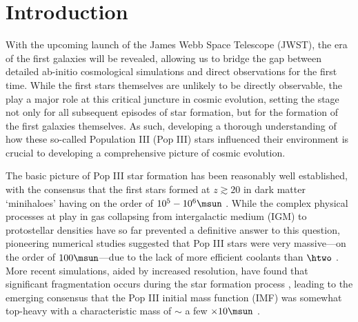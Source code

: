 \section{Introduction}
\label{intro}

With the upcoming launch of the James Webb Space Telescope (JWST), the era of the first galaxies will be revealed, allowing us to bridge the gap between detailed ab-initio cosmological simulations and direct observations for the first time. While the first stars themselves are unlikely to be directly observable, the play a major role at this critical juncture in cosmic evolution, setting the stage not only for all subsequent episodes of star formation, but for the formation of the first galaxies themselves.  As such, developing a thorough understanding of how these so-called Population III (Pop III) stars influenced their environment is crucial to developing a comprehensive picture of cosmic evolution.

The basic picture of Pop III star formation has been reasonably well established, with the consensus that the first stars formed at $z\gtrsim20$ in dark matter `minihaloes' having on the order of $10^5 - 10^6\msun$ \citep{CouchmanRees1986, HaimanThoulLoeb1996, Tegmarketal1997}. While the complex physical processes at play in gas collapsing from intergalactic medium (IGM) to protostellar densities have so far prevented a definitive answer to this question, pioneering numerical studies suggested that Pop III stars were very massive---on the order of $100\msun$---due to the lack of more efficient coolants than $\htwo$ \citep[e.g.,][]{BrommCoppiLarson1999, BrommCoppiLarson2002, AbelBryanNorman2002, Yoshidaetal2003, BrommLarson2004, Yoshidaetal2006, O'SheaNorman2007}. More recent simulations, aided by increased resolution, have found that significant fragmentation occurs during the star formation process \citep{StacyGreifBromm2010, Clarketal2011a, Clarketal2011b, Greifetal2011, Greifetal2012, StacyBromm2013, Hiranoetal2014}, leading to the emerging consensus that the Pop III initial mass function (IMF) was somewhat top-heavy with a characteristic mass of $\sim$ a few $\times 10\msun$ \citep{Bromm2013}.


